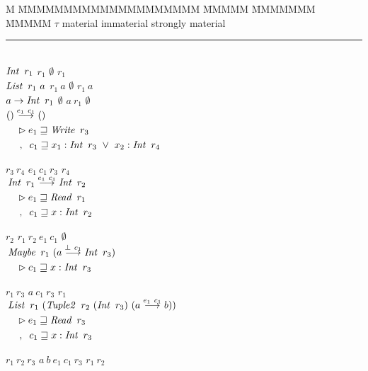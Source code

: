 \begin{tabbing}
M \= MMMMMMMMMMMMMMMMMMMM \= MMMMM \= MMMMMMM \= MMMMM \kill
	\> $\tau$			
	\> material
	\> immaterial
	\> strongly material
	\\[-1ex]
	\rule{40em}{0.1pt}
	\\
	\> $\begin{aligned}
		\operatorname{\mathit{Int}} \ r_1
	    \end{aligned}$		
	\> $r_1$				
	\> $\emptyset$
	\> $r_1$
	\\[2ex]
	\> $\begin{aligned}
		\operatorname{\mathit{List}} \ r_1 \ a
	    \end{aligned}$
	\> $r_1 \ a$				
	\> $\emptyset$
	\> $r_1 \ a$
	\\[2ex]
	\> $\begin{aligned}
		a \to \operatorname{\mathit{Int}} \ r_1
	    \end{aligned}$
	\> $\emptyset$
	\> $a \ r_1$
	\> $\emptyset$
	\\[2ex]
	\> $\begin{aligned}
	 & () \stackrel{e_1 \ c_1}{\longrightarrow} () \\
	 & \quad \rhd	  e_1 \sqsupseteq \operatorname{\mathit{Write}} \ r_3 \\
	 & \quad \ , \ \: c_1 \sqsupseteq x_1 : \operatorname{\mathit{Int}} \ r_3 \ \lor \ x_2 : \operatorname{\mathit{Int}} \ r_4 \\
	 \end{aligned}$\quad\quad
	\> \rule{0ex}{6ex}
	  $r_3 \ r_4$
	\> $e_1 \ c_1 \ r_3$
	\> $r_4$
	\\[4ex]
	\> $\begin{aligned}
	 & \operatorname{\mathit{Int}} \ r_1 \stackrel{e_1 \ c_1}{\longrightarrow} \operatorname{\mathit{Int}} \ r_2 \\
	 & \quad \rhd e_1 \sqsupseteq \operatorname{\mathit{Read}} \ r_1 \\
	 & \quad \ , \ \:  c_1 \sqsupseteq x : \operatorname{\mathit{Int}} \ r_2
	 \end{aligned}$ \quad \quad
	\> \rule{0ex}{6ex}
          $r_2$
	\> $r_1 \ r_2 \ e_1 \ c_1$
	\> $\emptyset$ 
	\\
	\> $\begin{aligned}
	 & \operatorname{\mathit{Maybe}} \ r_1 \ (a \stackrel{\bot \ c_1}{\longrightarrow} \operatorname{\mathit{Int}} \ r_3) \\
	 & \quad \rhd c_1 \sqsupseteq x : \operatorname{\mathit{Int}} \ r_3
	 \end{aligned}$ 
	\> \rule{0ex}{6ex}
    	  $r_1 \ r_3$
	\> $a \ c_1 \ r_3$
	\> $r_1$
	\\
	\> $\begin{aligned}
	 & \operatorname{\mathit{List}} \ r_1 \ (\operatorname{\mathit{Tuple2}} \ r_2 \ (\operatorname{\mathit{Int}} \ r_3) \ (a \stackrel{e_1 \ c_1}{\longrightarrow} b)) \\
	 & \quad \rhd 		e_1 \sqsupseteq \operatorname{\mathit{Read}} \ r_3 \\
	 & \quad \ , \ \: 	c_1 \sqsupseteq x : \operatorname{\mathit{Int}} \ r_3
	 \end{aligned}$ \quad 
	\> \rule{0ex}{8ex}
	  $r_1 \ r_2 \ r_3$
	\> $a \ b \ e_1 \ c_1 \ r_3$
	\> $r_1 \ r_2$
\end{tabbing}

